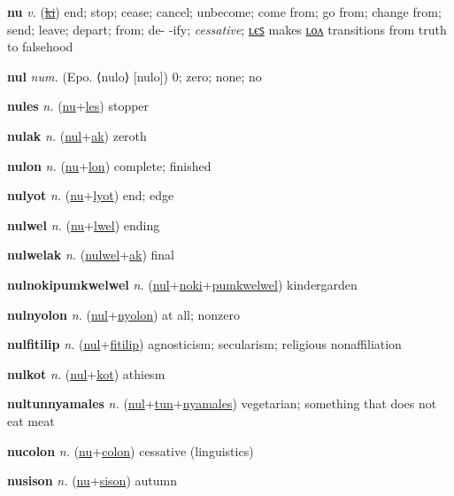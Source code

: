\textbf{\hypertarget{nu}{nu}} \textit{v.} (\hyperlink{ki}{\sout{ki}})
end; stop; cease; cancel; unbecome; come from; go from; change from; send; leave; depart; from; de- -ify; \textit{cessative}; \hyperlink{nules}{ʟєꜱ} makes \hyperlink{nulon}{ʟᴏᴧ} transitions from truth to falsehood

\textbf{\hypertarget{nul}{nul}} \textit{num.} (Epo. ⟨nulo⟩ [nulo])
0; zero; none; no

\textbf{\hypertarget{nules}{nules}} \textit{n.} (\hyperlink{nu}{nu}+\allowbreak \hyperlink{les}{les})
stopper

\textbf{\hypertarget{nulak}{nulak}} \textit{n.} (\hyperlink{nul}{nul}+\allowbreak \hyperlink{ak}{ak})
zeroth

\textbf{\hypertarget{nulon}{nulon}} \textit{n.} (\hyperlink{nu}{nu}+\allowbreak \hyperlink{lon}{lon})
complete; finished

\textbf{\hypertarget{nulyot}{nulyot}} \textit{n.} (\hyperlink{nu}{nu}+\allowbreak \hyperlink{lyot}{lyot})
end; edge

\textbf{\hypertarget{nulwel}{nulwel}} \textit{n.} (\hyperlink{nu}{nu}+\allowbreak \hyperlink{lwel}{lwel})
ending

\textbf{\hypertarget{nulwelak}{nulwelak}} \textit{n.} (\hyperlink{nulwel}{nulwel}+\allowbreak \hyperlink{ak}{ak})
final

\textbf{\hypertarget{nulnokipumkwelwel}{nulnokipumkwelwel}} \textit{n.} (\hyperlink{nul}{nul}+\allowbreak \hyperlink{noki}{noki}+\allowbreak \hyperlink{pumkwelwel}{pumkwelwel})
kindergarden

\textbf{\hypertarget{nulnyolon}{nulnyolon}} \textit{n.} (\hyperlink{nul}{nul}+\allowbreak \hyperlink{nyolon}{nyolon})
at all; nonzero

\textbf{\hypertarget{nulfitilip}{nulfitilip}} \textit{n.} (\hyperlink{nul}{nul}+\allowbreak \hyperlink{fitilip}{fitilip})
agnosticism; secularism; religious nonaffiliation

\textbf{\hypertarget{nulkot}{nulkot}} \textit{n.} (\hyperlink{nul}{nul}+\allowbreak \hyperlink{kot}{kot})
athiesm

\textbf{\hypertarget{nultunnyamales}{nultunnyamales}} \textit{n.} (\hyperlink{nul}{nul}+\allowbreak \hyperlink{tun}{tun}+\allowbreak \hyperlink{nyamales}{nyamales})
vegetarian; something that does not eat meat

\textbf{\hypertarget{nucolon}{nucolon}} \textit{n.} (\hyperlink{nu}{nu}+\allowbreak \hyperlink{colon}{colon})
cessative (linguistics)

\textbf{\hypertarget{nusison}{nusison}} \textit{n.} (\hyperlink{nu}{nu}+\allowbreak \hyperlink{sison}{sison})
autumn

